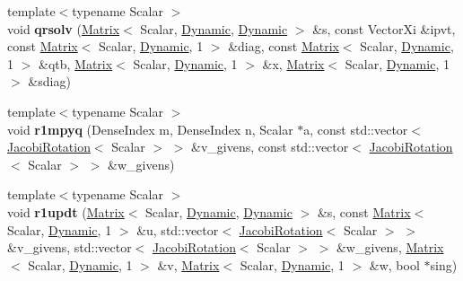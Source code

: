\begin{DoxyCompactItemize}
\item 
\mbox{\label{namespace_eigen_1_1internal_ac01cc898d45a6cc8ec6fbd825752c67a}} 
{\footnotesize template$<$typename Scalar $>$ }\\void {\bfseries qrsolv} (\hyperlink{group___core___module_class_eigen_1_1_matrix}{Matrix}$<$ Scalar, \hyperlink{namespace_eigen_ad81fa7195215a0ce30017dfac309f0b2}{Dynamic}, \hyperlink{namespace_eigen_ad81fa7195215a0ce30017dfac309f0b2}{Dynamic} $>$ \&s, const Vector\+Xi \&ipvt, const \hyperlink{group___core___module_class_eigen_1_1_matrix}{Matrix}$<$ Scalar, \hyperlink{namespace_eigen_ad81fa7195215a0ce30017dfac309f0b2}{Dynamic}, 1 $>$ \&diag, const \hyperlink{group___core___module_class_eigen_1_1_matrix}{Matrix}$<$ Scalar, \hyperlink{namespace_eigen_ad81fa7195215a0ce30017dfac309f0b2}{Dynamic}, 1 $>$ \&qtb, \hyperlink{group___core___module_class_eigen_1_1_matrix}{Matrix}$<$ Scalar, \hyperlink{namespace_eigen_ad81fa7195215a0ce30017dfac309f0b2}{Dynamic}, 1 $>$ \&x, \hyperlink{group___core___module_class_eigen_1_1_matrix}{Matrix}$<$ Scalar, \hyperlink{namespace_eigen_ad81fa7195215a0ce30017dfac309f0b2}{Dynamic}, 1 $>$ \&sdiag)
\item 
\mbox{\label{namespace_eigen_1_1internal_a333108054c8603fcec84abf1f637daf3}} 
{\footnotesize template$<$typename Scalar $>$ }\\void {\bfseries r1mpyq} (Dense\+Index m, Dense\+Index n, Scalar $\ast$a, const std\+::vector$<$ \hyperlink{group___jacobi___module_class_eigen_1_1_jacobi_rotation}{Jacobi\+Rotation}$<$ Scalar $>$ $>$ \&v\+\_\+givens, const std\+::vector$<$ \hyperlink{group___jacobi___module_class_eigen_1_1_jacobi_rotation}{Jacobi\+Rotation}$<$ Scalar $>$ $>$ \&w\+\_\+givens)
\item 
\mbox{\label{namespace_eigen_1_1internal_a7722c6b755413d56daaac51b9b4877ae}} 
{\footnotesize template$<$typename Scalar $>$ }\\void {\bfseries r1updt} (\hyperlink{group___core___module_class_eigen_1_1_matrix}{Matrix}$<$ Scalar, \hyperlink{namespace_eigen_ad81fa7195215a0ce30017dfac309f0b2}{Dynamic}, \hyperlink{namespace_eigen_ad81fa7195215a0ce30017dfac309f0b2}{Dynamic} $>$ \&s, const \hyperlink{group___core___module_class_eigen_1_1_matrix}{Matrix}$<$ Scalar, \hyperlink{namespace_eigen_ad81fa7195215a0ce30017dfac309f0b2}{Dynamic}, 1 $>$ \&u, std\+::vector$<$ \hyperlink{group___jacobi___module_class_eigen_1_1_jacobi_rotation}{Jacobi\+Rotation}$<$ Scalar $>$ $>$ \&v\+\_\+givens, std\+::vector$<$ \hyperlink{group___jacobi___module_class_eigen_1_1_jacobi_rotation}{Jacobi\+Rotation}$<$ Scalar $>$ $>$ \&w\+\_\+givens, \hyperlink{group___core___module_class_eigen_1_1_matrix}{Matrix}$<$ Scalar, \hyperlink{namespace_eigen_ad81fa7195215a0ce30017dfac309f0b2}{Dynamic}, 1 $>$ \&v, \hyperlink{group___core___module_class_eigen_1_1_matrix}{Matrix}$<$ Scalar, \hyperlink{namespace_eigen_ad81fa7195215a0ce30017dfac309f0b2}{Dynamic}, 1 $>$ \&w, bool $\ast$sing)

\end{DoxyCompactItemize}

